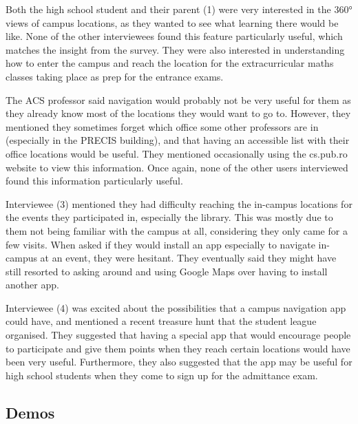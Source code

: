         Both the high school student and their parent (1) were very interested in the 360° views of campus locations, as they wanted to see what learning there would be like. None of the other interviewees found this feature particularly useful, which matches the insight from the survey. They were also interested in understanding how to enter the campus and reach the location for the extracurricular maths classes taking place as prep for the entrance exams.
        
        The ACS professor said navigation would probably not be very useful for them as they already know most of the locations they would want to go to. However, they mentioned they sometimes forget which office some other professors are in (especially in the PRECIS building), and that having an accessible list with their office locations would be useful. They mentioned occasionally using the cs.pub.ro website to view this information. Once again, none of the other users interviewed found this information particularly useful.
	    
	    Interviewee (3) mentioned they had difficulty reaching the in-campus locations for the events they participated in, especially the library. This was mostly due to them not being familiar with the campus at all, considering they only came for a few visits. When asked if they would install an app especially to navigate in-campus at an event, they were hesitant. They eventually said they might have still resorted to asking around and using Google Maps over having to install another app.
	    
	    Interviewee (4) was excited about the possibilities that a campus navigation app could have, and mentioned a recent treasure hunt that the student league organised. They suggested that having a special app that would encourage people to participate and give them points when they reach certain locations would have been very useful. Furthermore, they also suggested that the app may be useful for high school students when they come to sign up for the admittance exam.
         
    \subsection{Demos} \label{4:demos}
        
